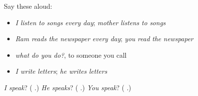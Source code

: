 Say these aloud:

\begin{itemize}
\raggedright
  \item \emph{I listen to songs every day}; \emph{mother listens to songs}
  \item \emph{Ram reads the newspaper every day}; \emph{you read the newspaper}
  \item \emph{what do you do?}, to someone you call \textbf{}
  \item \emph{I write letters}; \emph{he writes letters}
\end{itemize}

\begin{tcolorbox}[breakable,colback=teal!4,colframe=teal!35!black,title={Before you move on}]
\emph{I speak}? (\textbf{ }.) \emph{He speaks}? (\textbf{ }.) \emph{You speak}? (\textbf{ }.)
\end{tcolorbox}
